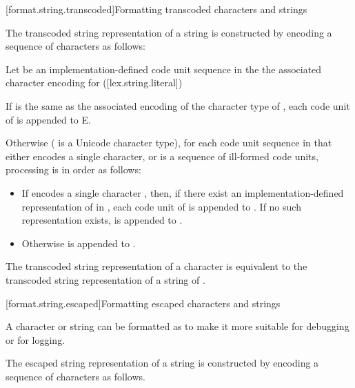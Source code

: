 \documentclass{wg21}
\begin{document}
\begin{addedblock}
[format.string.transcoded]{Formatting transcoded characters and strings}

The transcoded string  representation of a string 
is constructed by encoding a sequence of characters as follows:


Let  be an implementation-defined code unit sequence in the the associated character encoding  for   ([lex.string.literal])

If  is the same as the associated encoding  of the character type  of  ,
each code unit of   is appended to E.

Otherwise ( is a Unicode character type), for each code unit sequence  in  that either
encodes a single character, or is a sequence of ill-formed code units,
processing is in order as follows:
\begin{itemize}
\item If  encodes a single character , then, if there exist an implementation-defined representation 
of  in , each code unit of  is appended to . If no such representation exists,  is appended to .
\item Otherwise  is appended to .
\end{itemize}

The transcoded string representation of a character 
is equivalent to the transcoded string representation
of a string of .

\end{addedblock}

[format.string.escaped]{Formatting escaped characters and strings}

\pnum
{}%
%
A character or string can be formatted as 
to make it more suitable for debugging or for logging.

\pnum
The escaped string  representation of a string 
is constructed by encoding a sequence of characters as follows.
\end{document}
